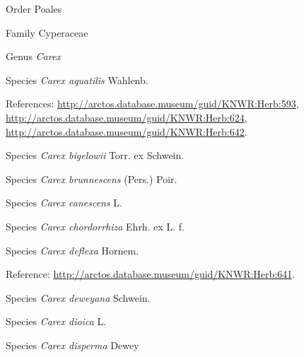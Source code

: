 \documentclass[9pt, article]{memoir}
\begin{document}
\begin{multicols}{2}
\vspace{6pt}\noindent\hspace{18pt}Order Poales


\vspace{6pt}\noindent\hspace{24pt}Family Cyperaceae


\vspace{6pt}\noindent\hspace{30pt}Genus \textit{Carex}


\vspace{6pt}\noindent\hspace{36pt}Species \textit{Carex aquatilis} Wahlenb.


\vspace{6pt}References: 
\url{http://arctos.database.museum/guid/KNWR:Herb:593}, 
\url{http://arctos.database.museum/guid/KNWR:Herb:624}, 
\url{http://arctos.database.museum/guid/KNWR:Herb:642}.

\vspace{6pt}\noindent\hspace{36pt}Species \textit{Carex bigelowii} Torr. ex Schwein.


\vspace{6pt}\noindent\hspace{36pt}Species \textit{Carex brunnescens} (Pers.) Poir.


\vspace{6pt}\noindent\hspace{36pt}Species \textit{Carex canescens} L.


\vspace{6pt}\noindent\hspace{36pt}Species \textit{Carex chordorrhiza} Ehrh. ex L. f.


\vspace{6pt}\noindent\hspace{36pt}Species \textit{Carex deflexa} Hornem.


\vspace{6pt}Reference: 
\url{http://arctos.database.museum/guid/KNWR:Herb:641}.

\vspace{6pt}\noindent\hspace{36pt}Species \textit{Carex deweyana} Schwein.


\vspace{6pt}\noindent\hspace{36pt}Species \textit{Carex dioica} L.


\vspace{6pt}\noindent\hspace{36pt}Species \textit{Carex disperma} Dewey



\end{multicols}
\end{document}
